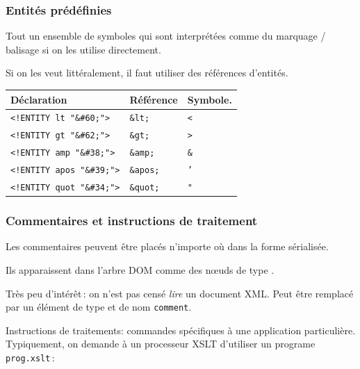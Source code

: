 \begin{frame}
\frametitle{Entités prédéfinies}

Tout un ensemble de symboles qui sont interprétées comme du marquage
 / balisage si on les utilise directement.

\vfill
 Si on les veut \alert{littéralement}, il faut utiliser des références d'entités.

\vfill
 
\begin{tabular}{l|l|l}
{\bf Déclaration} & {\bf Référence}&{\bf Symbole.}\\ 
\hline 
\texttt{<!ENTITY lt   "\&\#60;">}&\texttt{\&lt;}&\texttt{<}\\ 
\texttt{<!ENTITY gt   "\&\#62;">}&\texttt{\&gt;}&\texttt{>}\\ 
\texttt{<!ENTITY amp  "\&\#38;">}&\texttt{\&amp;}&\texttt{\&}\\ 
\texttt{<!ENTITY apos "\&\#39;">}&\texttt{\&apos;}&\texttt{'}\\ 
\texttt{<!ENTITY quot "\&\#34;">}&\texttt{\&quot;}&\texttt{"} \\ \hline
\end{tabular}

\end{frame}

\begin{frame}
\frametitle{Commentaires et instructions de traitement}

Les \alert{commentaires} peuvent être placés n'importe où dans la forme sérialisée.

\vfill

   \begin{center}
    \end{center}

\vfill

  Ils apparaissent dans l'arbre DOM comme des n{\oe}uds de type .

\begin{remark}
Très peu d'intérêt\,: on n'est pas censé \emph{lire} un document XML. Peut être remplacé par un
élément de type  et de nom \texttt{comment}.
\end{remark}
\vfill

\alert{Instructions de traitements}: commandes spécifiques à une application particulière.
\vfill
Typiquement, on demande à un processeur XSLT d'utiliser un programe \texttt{prog.xslt}\,:

\begin{center}
\end{center}

\end{frame}


